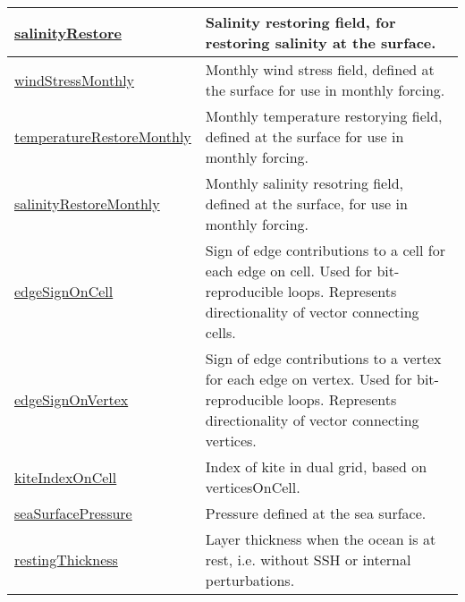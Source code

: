 {\begin{center}
\begin{longtable}{| p{2.0in} | p{4.0in} |}
	\hline
	\hyperref[subsec:var_sec_mesh_salinityRestore]{salinityRestore} & Salinity restoring field, for restoring salinity at the surface. \\
	\hline
	\hyperref[subsec:var_sec_mesh_windStressMonthly]{windStressMonthly} & Monthly wind stress field, defined at the surface for use in monthly forcing. \\
	\hline
	\hyperref[subsec:var_sec_mesh_temperatureRestoreMonthly]{temperatureRestoreMonthly} & Monthly temperature restorying field, defined at the surface for use in monthly forcing. \\
	\hline
	\hyperref[subsec:var_sec_mesh_salinityRestoreMonthly]{salinityRestoreMonthly} & Monthly salinity resotring field, defined at the surface, for use in monthly forcing. \\
	\hline
	\hyperref[subsec:var_sec_mesh_edgeSignOnCell]{edgeSignOnCell} & Sign of edge contributions to a cell for each edge on cell. Used for bit-reproducible loops. Represents directionality of vector connecting cells. \\
	\hline
	\hyperref[subsec:var_sec_mesh_edgeSignOnVertex]{edgeSignOnVertex} & Sign of edge contributions to a vertex for each edge on vertex. Used for bit-reproducible loops. Represents directionality of vector connecting vertices. \\
	\hline
	\hyperref[subsec:var_sec_mesh_kiteIndexOnCell]{kiteIndexOnCell} & Index of kite in dual grid, based on verticesOnCell. \\
	\hline
	\hyperref[subsec:var_sec_mesh_seaSurfacePressure]{seaSurfacePressure} & Pressure defined at the sea surface. \\
	\hline
	\hyperref[subsec:var_sec_mesh_restingThickness]{restingThickness} & Layer thickness when the ocean is at rest, i.e. without SSH or internal perturbations. \\
	\hline
\end{longtable}
\end{center}
}
